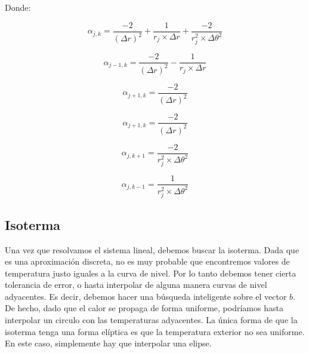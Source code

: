 Donde:

\begin{equation}
\alpha_{j,k} = \frac{-2}{(\Delta r)^2} + \frac{1}{r_j \times \Delta r} + \frac{-2}{r_j^2 \times \Delta \theta^2}
\end{equation}

\begin{equation}
\alpha_{j-1,k} = \frac{-2}{(\Delta r)^2} - \frac{1}{r_j \times \Delta r}
\end{equation}

\begin{equation}
\alpha_{j+1,k} = \frac{-2}{(\Delta r)^2}
\end{equation}

\begin{equation}
\alpha_{j+1,k} = \frac{-2}{(\Delta r)^2}
\end{equation}

\begin{equation}
\alpha_{j,k+1} = \frac{-2}{r_j^2 \times \Delta \theta^2}
\end{equation}

\begin{equation}
\alpha_{j,k-1} = \frac{1}{r_j^2 \times \Delta \theta^2}
\end{equation}

\subsection{Isoterma}
Una vez que resolvamos el sistema lineal, debemos buscar la isoterma. Dada que es una aproximación discreta, no es muy probable que encontremos valores de temperatura justo iguales a la curva de nivel. Por lo tanto debemos tener cierta tolerancia de error, o hasta interpolar de alguna manera curvas de nivel adyacentes. Es decir, debemos hacer una búsqueda inteligente sobre el vector $b$. De hecho, dado que el calor se propaga de forma uniforme, podríamos hasta interpolar un circulo con las temperaturas adyacentes. La única forma de que la isoterma tenga una forma elíptica es que la temperatura exterior no sea uniforme. En este caso, simplemente hay que interpolar una elipse.